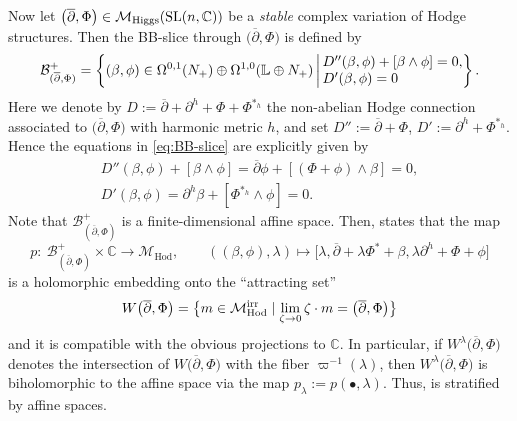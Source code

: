 \documentclass[pdftex]{sigma}
\numberwithin{equation}{section}
\theoremstyle{definition}
\newcommand\C{{\mathbb C}}
\begin{document}
Now let $\bigl({\overline{\partial}}, \Phi\bigr) \in \mathcal{M}_{\rm Higgs}(\operatorname{SL}(n,\C))$ be a \emph{stable} complex variation of Hodge structures.
Then the BB-slice \cite[Definition~3.7]{CollierWentworth} through $\bigl({\overline{\partial}}, \Phi\bigr)$ is defined by
\begin{align}\label{eq:BB-slice}
\mathcal{B}^+_{({\overline{\partial}},\Phi)} =
\left\{ (\beta, \phi) \in \Omega^{0,1}(N_+)
\oplus \Omega^{1,0}(\mathbb{L}\oplus N_+)\,\bigg\vert\,
\begin{array}{@{}l@{}}
D''(\beta, \phi)+ [\beta\wedge\phi] = 0,\\
D'(\beta, \phi) = 0
\end{array}
\right\}.
\end{align}
Here we denote by
$
D := {\overline{\partial}}+\partial^h +\Phi+\Phi^{*_h}
$
the non-abelian Hodge connection associated to $\bigl({\overline{\partial}}, \Phi\bigr)$ with harmonic metric $h$, and set
$
D'' := {\overline{\partial}}+\Phi$, $ D' := \partial^h+\Phi^{*_h}$.
Hence the equations in \eqref{eq:BB-slice} are explicitly given by
\begin{gather}
D''(\beta, \phi) + [\beta\wedge\phi] = {\overline{\partial}} \phi + [(\Phi+\phi)\wedge\beta]
 = 0,\nonumber \\
D'(\beta, \phi) = \partial^{h}\beta +[\Phi^{*_h}\wedge\phi] = 0.\label{eq:BB-slice2}
\end{gather}
Note that $\mathcal{B}^+_{({\overline{\partial}},\Phi)}$ is a finite-dimensional affine space. Then, \cite[Theorem 1.4\,(3)]{CollierWentworth} states
that the map
\[%
p \colon\ \mathcal{B}^+_{({\overline{\partial}},\Phi)}\times \C \longrightarrow
\mathcal{M}_{\mathrm{Hod}},\qquad ((\beta, \phi), \lambda) \longmapsto \big[\lambda, {\overline{\partial}} + \lambda \Phi^* +\beta,
 \lambda\partial^h+\Phi +\phi\big]
\]
is a holomorphic embedding onto the ``attracting set''
\[
W\bigl({\overline{\partial}}, \Phi\bigr) = \bigl\{ m \in \mathcal{M}_{\mathrm{Hod}}^{\rm irr} \mid \lim_{\zeta \to 0}\zeta\cdot m = \bigl({\overline{\partial}}, \Phi\bigr)\bigr\}
\]
and it is compatible with the obvious projections to $\C$.
In particular, if $W^\lambda\bigl({\overline{\partial}}, \Phi\bigr)$ denotes the intersection of $W\bigl({\overline{\partial}}, \Phi\bigr)$ with
the fiber $\varpi^{-1}(\lambda)$, then $W^\lambda\bigl({\overline{\partial}}, \Phi\bigr)$ is biholomorphic to the
affine space  via the map $p_{\lambda} := p(\bullet, \lambda)$.
Thus,  is stratified by affine spaces.
\end{document}
